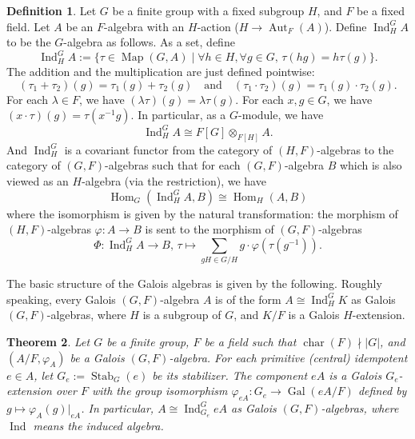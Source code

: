 \documentclass[12pt,a4paper]{amsart}
\numberwithin{equation}{section}%
\theoremstyle{plain}%
\newtheorem{theorem}{Theorem}[section]%
\theoremstyle{definition}%
\newtheorem{definition}[theorem]{Definition}%
\theoremstyle{remark}%
\begin{document}
	\begin{definition}\label{def: induced algebra}
		Let $G$ be a finite group with a fixed subgroup $H$, and $F$ be a fixed field.
		Let $A$ be an $F$-algebra with an $H$-action ($H\to\operatorname{Aut}_{F}(A)$).
		Define $\operatorname{Ind}^{G}_{H}A$ to be the $G$-algebra as follows.
		As a set, define
		\begin{equation*}
			\operatorname{Ind}^{G}_{H}A:=\{\tau\in\operatorname{Map}(G,A)\mid\forall h\in H,\forall g\in G,\, \tau(hg)=h\tau(g)\}.
		\end{equation*}
		The addition and the multiplication are just defined pointwise:
		\begin{equation*}
			(\tau_{1}+\tau_{2})(g)=\tau_{1}(g)+\tau_{2}(g)\quad\text{and}\quad (\tau_{1}\cdot\tau_{2})(g)=\tau_{1}(g)\cdot\tau_{2}(g).
		\end{equation*}
		For each $\lambda\in F$, we have $(\lambda\tau)(g)=\lambda\tau(g)$.
		For each $x,g\in G$, we have $(x\cdot\tau)(g)=\tau(x^{-1}g)$.
		In particular, as a $G$-module, we have
		\begin{equation*}
			\operatorname{Ind}^{G}_{H}A\cong F[G]\otimes_{F[H]}A.
		\end{equation*}
		And $\operatorname{Ind}^{G}_{H}$ is a covariant functor from the category of $(H,F)$-algebras to the category of $(G,F)$-algebras such that for each $(G,F)$-algebra $B$ which is also viewed as an $H$-algebra (via the restriction), we have
		\begin{equation*}
			\operatorname{Hom}_{G}(\operatorname{Ind}^{G}_{H}A,B)\cong\operatorname{Hom}_{H}(A,B)
		\end{equation*}
		where the isomorphism is given by the natural transformation:
		the morphism of $(H,F)$-algebras $\varphi:A\to B$ is sent to the morphism of $(G,F)$-algebras
		\begin{equation*}
			\Phi:\operatorname{Ind}^{G}_{H}A\to B,\, \tau\mapsto\sum_{gH\in G/H}g\cdot\varphi(\tau(g^{-1})).
		\end{equation*}
	\end{definition}
	The basic structure of the Galois algebras is given by the following.
	Roughly speaking, every Galois $(G,F)$-algebra $A$ is of the form $A\cong\operatorname{Ind}^{G}_{H}K$ as Galois $(G,F)$-algebras, where $H$ is a subgroup of $G$, and $K/F$ is a Galois $H$-extension.
	\begin{theorem}\label{thm: structure of Galois algebras}
		Let $G$ be a finite group, $F$ be a field such that $\operatorname{char}(F)\nmid\lvert G\rvert$, and $(A/F,\varphi_A)$ be a Galois $(G,F)$-algebra.
		For each primitive (central) idempotent $e\in A$, let $G_e:=\operatorname{Stab}_G(e)$ be its stabilizer.
		The component $eA$ is a Galois $G_e$-extension over $F$ with the group isomorphism $\varphi_{eA}:G_e\to\operatorname{Gal}(eA/F)$ defined by $g\mapsto\varphi_A(g)\vert_{eA}$.
		In particular, $A\cong\operatorname{Ind}^G_{G_e} eA$ as Galois $(G,F)$-algebras, where $\operatorname{Ind}$ means the induced algebra.
	\end{theorem}
\end{document}
